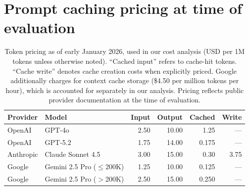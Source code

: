 \documentclass{article}
\theoremstyle{plain}
\theoremstyle{definition}
\theoremstyle{remark}
\begin{document}


\appendix
\newpage
\onecolumn
\section{Prompt caching pricing at time of evaluation}
\label{app:pricing}
\FloatBarrier

\begin{table}[ht]
\centering
\small
\setlength{\tabcolsep}{4pt}
\caption{
Token pricing as of early January 2026, used in our cost analysis (USD per 1M tokens unless otherwise noted).
``Cached input'' refers to cache-hit tokens. ``Cache write'' denotes cache creation costs when explicitly priced. Google additionally charges for context cache storage
(\$4.50 per million tokens per hour), which is accounted for separately in our analysis.
Pricing reflects public provider documentation at the time of evaluation. \citep{openai_prompt_caching_docs, anthropic_prompt_caching_docs, google_vertex_claude_prompt_caching_docs}
}
\label{tab:caching_pricing}
\begin{tabular}{
@{}p{2.6cm} p{3.6cm}
rrrr@{}
}
\toprule
\textbf{Provider} & \textbf{Model} &
\textbf{Input} &
\textbf{Output} &
\textbf{Cached} &
\textbf{Write} \\
\midrule
OpenAI
& GPT-4o
& 2.50 & 10.00 & 1.25 & --- \\

OpenAI
& GPT-5.2
& 1.75 & 14.00 & 0.175 & --- \\

\midrule
Anthropic
& Claude Sonnet 4.5
& 3.00 & 15.00 & 0.30 & 3.75 \\

\midrule
Google 
& Gemini 2.5 Pro ($\le$200K)
& 1.25 & 10.00 & 0.125 & --- \\

Google 
& Gemini 2.5 Pro ($>$200K)
& 2.50 & 15.00 & 0.250 & --- \\
\bottomrule
\end{tabular}

\vspace{0.4em}
\end{table}
\end{document}
